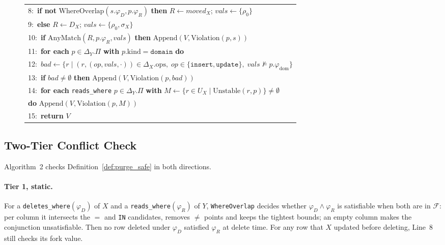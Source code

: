 \documentclass[sigconf, nonacm]{acmart}
\begin{document}
\begin{figure}[t]
\begin{tabularx}{\columnwidth}{@{}X@{}}
8:\ \hspace{3em}\textbf{if not} $\text{WhereOverlap}(s.\varphi_D, p.\varphi_R)$ \textbf{then} $R \gets \mathit{moved}_X$;\; $\mathit{vals} \gets \{\rho_0\}$ \\
9:\ \hspace{3em}\textbf{else} $R \gets D_X$;\; $\mathit{vals} \gets \{\rho_0, \sigma_X\}$ \\
10:\ \hspace{2.65em}\textbf{if} $\text{AnyMatch}(R, p.\varphi_R, \mathit{vals})$ \textbf{then} $\text{Append}(V, \text{Violation}(p, s))$ \\
11:\ \hspace{1em}\textbf{for each} $p \in \Delta_Y.\Pi$ \textbf{with} $p.\text{kind} = \texttt{domain}$ \textbf{do} \\
12:\ \hspace{2em}$\mathit{bad} \gets \{r \mid (r, (\mathit{op}, \mathit{vals}, \cdot)) \in \Delta_X.\text{ops},\; \mathit{op} \in \{\texttt{insert},\texttt{update}\},\; \mathit{vals} \not\models p.\varphi_{\text{dom}}\}$ \\
13:\ \hspace{2em}\textbf{if} $\mathit{bad} \neq \emptyset$ \textbf{then} $\text{Append}(V, \text{Violation}(p, \mathit{bad}))$ \\
14:\ \hspace{1em}\textbf{for each} \texttt{reads\_where} $p \in \Delta_Y.\Pi$ \textbf{with} $M \gets \{r \in U_X \mid \text{Unstable}(r, p)\} \neq \emptyset$ \\
\hspace{2.65em}\textbf{do} $\text{Append}(V, \text{Violation}(p, M))$ \\
15:\ \textbf{return} $V$ \\
\bottomrule
\end{tabularx}
\end{figure}

\subsection{Two-Tier Conflict Check}
\label{sec:design_conflict}

Algorithm~2 checks Definition~\ref{def:purge_safe} in both directions.

\paragraph{Tier 1, static.} For a \texttt{deletes\_\allowbreak where}$(\varphi_D)$ of $X$ and a \texttt{reads\_\allowbreak where}$(\varphi_R)$ of $Y$, \texttt{Where\allowbreak Overlap} decides whether $\varphi_D \land \varphi_R$ is satisfiable when both are in $\mathcal{F}$: per column it intersects the $=$ and \texttt{IN} candidates, removes $\neq$ points and keeps the tightest bounds; an empty column makes the conjunction unsatisfiable. Then no row deleted under $\varphi_D$ satisfied $\varphi_R$ at delete time. For any row that $X$ updated before deleting, Line~8 still checks its fork value.
\end{document}
